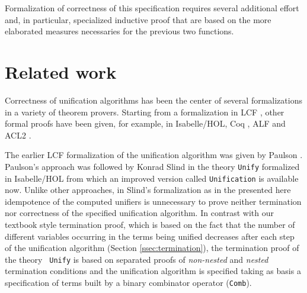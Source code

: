 \documentclass[submission,copyright,creativecommons]{eptcs}
\begin{document}
  Formalization of correctness of this specification requires several
  additional effort and, in particular, specialized inductive proof
  that are based on the more elaborated measures necessaries for the
  previous two functions.

  \section{Related work}

  Correctness of unification algorithms has been the center of several
  formalizations in a variety of theorem provers. Starting from a
  formalization in LCF \cite{Pa1985}, other formal proofs have been
  given, for example, in Isabelle/HOL, Coq
  \cite{Rou1992,BlKo2011,KoCa2009}, ALF \cite{Bove1999} and ACL2
  \cite{RRMMAH2006}.

  The earlier LCF formalization of the unification algorithm was given
  by Paulson \cite{Pa1985}. Paulson's approach was followed by Konrad
  Slind in the theory {\tt Unify} formalized in Isabelle/HOL from
  which an improved version called {\tt Unification} is available
  now. Unlike other approaches, in Slind's formalization as in the
  presented here idempotence of the computed unifiers is unnecessary
  to prove neither termination nor correctness of the specified
  unification algorithm.  In contrast with our textbook style
  termination proof, which is based on the fact that the number of
  different variables occurring in the terms being unified decreases
  after each step of the unification algorithm (Section
  \ref{ssec:termination}), the termination proof of the theory {\tt
    Unify} is based on separated proofs of \emph{non-nested} and
  \emph{nested} termination conditions and the unification algorithm
  is specified taking as basis a specification of terms built by a binary
  combinator operator ({\tt Comb}).
\end{document}
